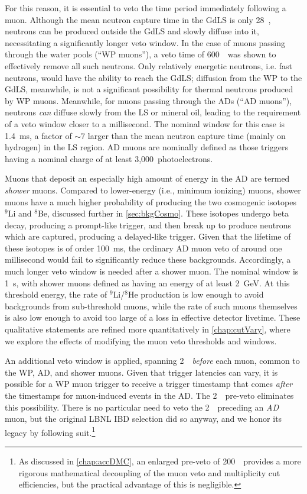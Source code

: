 \documentclass[../thesis.tex]{subfiles}
\begin{document}
For this reason, it is essential to veto the time period immediately following a muon. Although the mean neutron capture time in the GdLS is only 28~\us, neutrons can be produced outside the GdLS and slowly diffuse into it, necessitating a significantly longer veto window. In the case of muons passing through the water pools (``WP muons''), a veto time of 600~\us\ was shown to effectively remove all such neutrons. Only relatively energetic neutrons, i.e. fast neutrons, would have the ability to reach the GdLS; diffusion from the WP to the GdLS, meanwhile, is not a significant possibility for thermal neutrons produced by WP muons. Meanwhile, for muons passing through the ADs (``AD muons''), neutrons \emph{can} diffuse slowly from the LS or mineral oil, leading to the requirement of a veto window closer to a millisecond. The nominal window for this case is 1.4~ms, a factor of $\sim$7 larger than the mean neutron capture time (mainly on hydrogen) in the LS region. AD muons are nominally defined as those triggers having a nominal charge of at least 3,000~photoelectrons.

Muons that deposit an especially high amount of energy in the AD are termed \emph{shower} muons. Compared to lower-energy (i.e., minimum ionizing) muons, shower muons have a much higher probability of producing the two cosmogenic isotopes $^9$Li and $^8$Be, discussed further in \autoref{sec:bkgCosmo}. These isotopes undergo beta decay, producing a prompt-like trigger, and then break up to produce neutrons which are captured, producing a delayed-like trigger. Given that the lifetime of these isotopes is of order 100~ms, the ordinary AD muon veto of around one millisecond would fail to significantly reduce these backgrounds. Accordingly, a much longer veto window is needed after a shower muon. The nominal window is 1~s, with shower muons defined as having an energy of at least 2~GeV. At this threshold energy, the rate of $^9$Li/$^8$He production is low enough to avoid backgrounds from sub-threshold muons, while the rate of such muons themselves is also low enough to avoid too large of a loss in effective detector livetime. These qualitative statements are refined more quantitatively in \autoref{chap:cutVary}, where we explore the effects of modifying the muon veto thresholds and windows.

An additional veto window is applied, spanning 2~\us\ \emph{before} each muon, common to the WP, AD, and shower muons. Given that trigger latencies can vary, it is possible for a WP muon trigger to receive a trigger timestamp that comes \emph{after} the timestamps for muon-induced events in the AD. The 2~\us\ pre-veto eliminates this possibility. There is no particular need to veto the 2~\us\ preceding an \emph{AD} muon, but the original LBNL IBD selection did so anyway, and we honor its legacy by following suit.\footnote{As discussed in \autoref{chap:accDMC}, an enlarged pre-veto of 200~\us\ provides a more rigorous mathematical decoupling of the muon veto and multiplicity cut efficiencies, but the practical advantage of this is negligible.}
\end{document}
